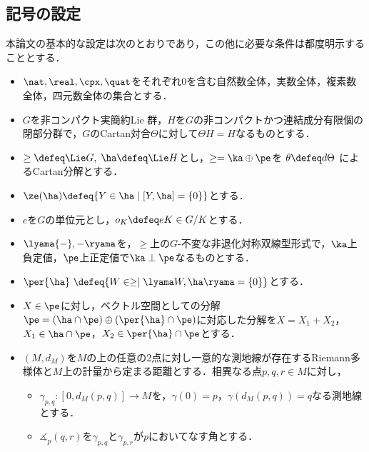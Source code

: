 
\newcommand*\ccircled[4]{\tikz[baseline=(char.base)]{
    \node[shape=circle, fill=#2, draw=#3, text=#4, inner sep=1pt] (char) {#1};}}
\newcommand{\cnum}[1]{\, \ccircled{#1}{MediumTurquoise!40}{MediumTurquoise!40}{black}\,}

\subsection{記号の設定}
本論文の基本的な設定は次のとおりであり，この他に必要な条件は都度明示することとする．

\begin{nttdef}
  \leavevmode\vspace{-1em}
  \begin{itemize}
  \item $\nat,\real, \cpx,\quat$をそれぞれ0を含む自然数全体，実数全体，複素数全体，四元数全体の集合とする．
  \item $G$を非コンパクト実簡約Lie 群，$H$を$G$の非コンパクトかつ連結成分有限個の閉部分群で，$G$のCartan対合$\Theta$に対して$\Theta H = H$なるものとする．
  \item $\ge \defeq \Lie G,\; \ha \defeq \Lie H$とし，$\ge = \ka\oplus \pe$を $\theta \defeq d\Theta$ によるCartan分解とする．
  \item $\ze(\ha)\defeq \{Y\in \ha\mid [Y,\ha] = \{0\} \} $とする．
  \item $e$を$G$の単位元とし，$o_K \defeq eK\in G/K$とする．
  \item $\lyama{-},{-} \ryama$を，$\ge$上の$G$-不変な非退化対称双線型形式で，$\ka$上負定値，$\pe$上正定値で$\ka\perp \pe$なるものとする．
  \item $\per{\ha}\ \defeq \{W\in \ge\mid \lyama W, \ha\ryama = \{0\}\} $とする．
  \item $X\in \pe$に対し，ベクトル空間としての分解$\pe =( \ha\cap \pe)\oplus(\per{\ha}\cap \pe) $に対応した分解を$X = X_1 + X_2 $，$X_1 \in \ha\cap \pe$，$X_2\in \per{\ha}\cap \pe$とする．
  \item $(M,d_M)$を$M$の上の任意の2点に対し一意的な測地線が存在するRiemann多様体と$M$上の計量から定まる距離とする．相異なる点$p,q,r \in M$に対し，
    \begin{itemize}
    \item $\gamma_{p,q}\colon [0, d_{M}(p,q)] \to M$を，$\gamma(0) =  p$，$\gamma(d_{M}(p,q)) = q $なる測地線とする．
    \item $\measuredangle_{p}(q, r)$を$\gamma_{p,q} $と$\gamma_{p,r} $が$p$においてなす角とする．
    \end{itemize}
  \end{itemize}  
\end{nttdef}

